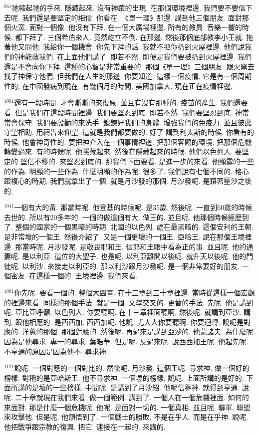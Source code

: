 \documentclass{book}
\begin{document}
$^{961}$祂縮起祂的手來.
隱藏起來.
沒有神蹟的出現.
在那個環境裡邊.
我們要不要信下去呢.
我們還是要堅定的相信.
你看在.
《單一理》那邊.
講到他三個朋友.
面對那個火窯.
面對一個像.
他沒有下拜.
在一個大廣場裡邊.
所有的教員.
音樂一響的時候.
都下拜了.
三個希伯來人.
竟然屹立不倒.
在那邊.
然後那個底部教李小王就.
拖著他又問他.
我給你一個機會.
你先下拜的話.
我就不把你扔到火屋裡邊.
他們說我們的神能救我們.
在上面他們講了.
即若不然.
即便是我們要被扔到火屋裡邊.
我們還是不會向你下拜.
這種的心智是非常重要的.
那個《單一理》三個朋友.
跟火窯去找了神保守他們.
但我們在人生的那邊.
你要知道.
這樣一個疫情.
它是有一個周期性的.
在中國發病到現在.
有幾個月的時間.
美國加拿大.
現在正在疫情裡邊.

$^{1001}$還有一段時間.
才會漸漸的來復原.
並且有沒有那種的.
疫苗的產生.
我們還要看.
但是我們在這段時間裡邊.
我們要堅忍到底.
即若不然.
我們要堅忍到底.
神常常會保守.
我們要殷勤的來洗手.
鍛鍊好我們的身體.
增強我們的免疫力.
並且彼此守望相助.
用禱告來仰望.
這就是我們都要做的.
好了 講到利太斯的時候.
你看有的時候.
他會神奇性的.
要把神介入在一個事情裡邊.
把那個客觀的環境.
把那個危機轉變過來.
有的時候呢.
他隱藏起來.
然後在隱藏起來的時候.
他們以色列人.
要堅定的 堅信不移的.
來堅忍到底的.
那我們下面要看.
是進一步的來看.
他顯露的一些的作為.
明顯的一些作為.
什麼明顯的作為呢.
很多了.
我們說有七個不同的.
格心跟複心的時期.
我們就拿出了一個.
就是月沙發的那個.
月沙發呢.
是藉著壓沙之後的.

$^{1041}$一個有大的黃.
那當時呢.
他登基的時候呢.
是35歲.
然後呢.
一直到60歲的時候去世的.
所以有20多年的.
一個的做這個有大.
做王的.
並且呢.
他那個時候經歷到了.
整個的國家的一個黑暗的時期.
北國的以色列.
處在最黑暗的.
這個安利的王朝.
是非常壞的一個王.
然後介紹了.
又是一個更壞的一個王.
亞哈王.
說在那個王境裡邊.
那當時呢.
月沙發呢.
是敬畏耶和王.
信耶和王眼中看為正的事.
並且呢.
他的通妻呢.
是以利亞.
這位的大聖子.
也是呢.
以利亞離開以後呢.
就升天以後呢.
他的門徒呢.
以利沙.
來接走以利亞的.
那以利沙跟月沙發呢.
是一個非常要好的朋友.
一個密友.
在這樣一個的.
王境裡邊.
我們來看.

$^{1081}$你先呢.
要看一個的.
整個大圖畫.
在十三章到三十章裡邊.
當時從這樣一個宏觀的裡邊來看.
同樣的那個手法.
就是一個.
文學交叉的.
更替的手法.
先呢.
他是講到呢.
亞比亞呼籲.
以色列人.
你要聽啊.
在十三章裡面聽啊.
然後呢.
就講到亞沙.
講到.
跟他相應的.
是西西加.
西西加呢.
他說.
尤大人你要聽啊.
你要迴轉.
說呢是對應的.
洋蔥的那個.
那個對應的.
然後呢.
再過來是講到亞沙的.
他蒙諸夫.
為什麼呢.
因為是他尋求.
專一的尋求.
葉皓華.
但是呢.
反過來呢.
說西西加王呢.
他起先呢.
不亨通的原因是因為他不.
尋求神.

$^{1121}$說呢.
一個對應的一個對比的.
然後呢.
月沙發.
這個王呢.
尋求神.
做一個好的榜樣.
對稱的是亞哈斯王.
他不尋求神.
一個壞的榜樣.
說呢.
上面所講的是好的.
下面所講的是壞的一些榜樣.
中間呢.
是講到了月沙紹.
他呢信靠神.
就得到亨通.
說呢.
二十章就現在我們來看.
做一個範例.
講到了.
一個人在一個危機裡面.
如何的來面對.
那是什麼一個危機呢.
他呢.
是面對一切的.
一個真相.
並且呢.
聯軍.
聯盟來攻擊他.
但是呢.
他領悟到了.
一個戰士的勝敗.
不是在乎人.
而是在乎神.
說呢.
他把戰爭跟宗教的復興.
把它.
連接在一起的.
來講的.
\end{document}
